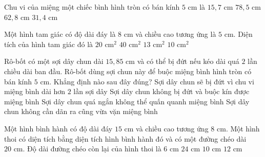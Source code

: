\begin{ex} %
Chu vi của miệng một chiếc bình hình tròn có bán kính $5\text{ cm}$ là
\choice
{$15{,}7\text{ cm}$}
{$78{,}5\text{ cm}$}
{$62{,}8\text{ cm}$}
{\True $31{,}4\text{ cm}$}
\end{ex}

\begin{ex} %
Một hình tam giác có độ dài đáy là $8\text{ cm}$ và chiều cao tương ứng là $5\text{ cm}$. Diện tích của hình tam giác đó là
\choice
{\True $20\text{ cm}^2$}
{$40\text{ cm}^2$}
{$13\text{ cm}^2$}
{$10\text{ cm}^2$}
\end{ex}

\begin{ex} %
Rô-bốt có một sợi dây chun dài $15{,}85\text{ cm}$ và có thể bị đứt nếu kéo dài quá $2$ lần chiều dài ban đầu. Rô-bốt dùng sợi chun này để buộc miệng bình hình tròn có bán kính $5\text{ cm}$. Khẳng định nào sau đây đúng?
\choice
{Sợi dây chun sẽ bị đứt vì chu vi miệng bình dài hơn $2$ lần sợi dây}
{\True Sợi dây chun không bị đứt và buộc kín được miệng bình}
{Sợi dây chun quá ngắn không thể quấn quanh miệng bình}
{Sợi dây chun không cần dãn ra cũng vừa vặn miệng bình}
\end{ex}

\begin{ex} %
Một hình bình hành có độ dài đáy $15\text{ cm}$ và chiều cao tương ứng $8\text{ cm}$. Một hình thoi có diện tích bằng diện tích hình bình hành đó và có một đường chéo dài $20\text{ cm}$. Độ dài đường chéo còn lại của hình thoi là
\choice
{$6\text{ cm}$}
{$24\text{ cm}$}
{$10\text{ cm}$}
{\True $12\text{ cm}$}
\end{ex}

